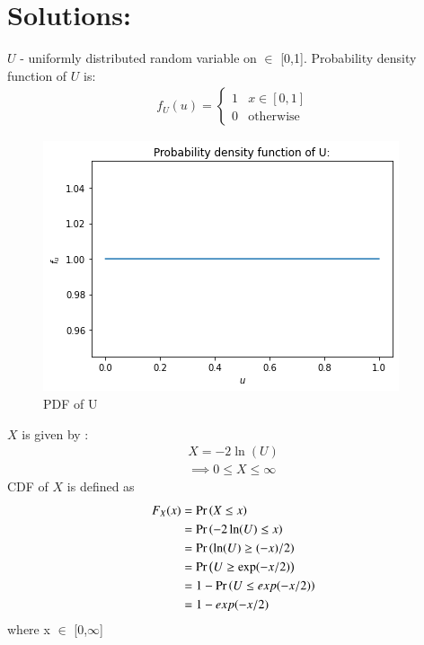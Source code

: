 \documentclass[journal,12pt,twocolumn]{IEEEtran}
\begin{document}
\section{Solutions:}
$U$ - uniformly distributed random variable on $\in$ [0,1]. 
Probability density function of $U$ is: 
\begin{align}
    f_U(u) =
    \begin{cases}
     1  & x \in  [0,1] \\
    0 & \text{otherwise} 
    \end{cases}
\end{align}
\begin{figure}[h]
\begin{center}
\includegraphics[width = \linewidth]{figure1.png}
\caption{PDF of U}
\label{PDF}
\end{center}
\end{figure}
 $X$ is given by :
\begin{align}
  X = -2 \ln(U) \\
\implies    0 \leq X \leq \infty
\end{align}
CDF of  $X$ is defined as 
\begin{align}
    F_X(x) &= \Pr\left(X \le x\right) \\
           &= \Pr\left(-2 \ln(U)\le x\right) \\
           &= \Pr\left(\ln(U) \ge( -x) /2\right)\\
           &= \Pr\left(U \ge \exp(-x/2)\right)\\
           &= 1 - \Pr\left(U \le exp(-x/2)\right)\\
           &= 1 - exp(-x/2) 
\end{align}
where x $\in$ [0,$\infty$] \\
\end{document}
